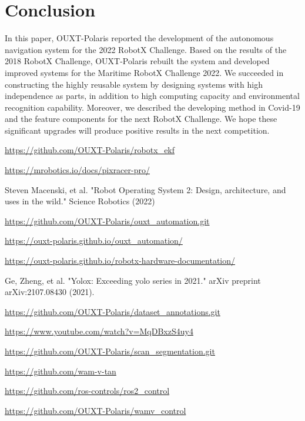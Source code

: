 \documentclass[lettersize,journal]{IEEEtran}
\begin{document}
\section{Conclusion}
In this paper, OUXT-Polaris reported the development of the autonomous navigation system for the 2022 RobotX Challenge.
Based on the results of the 2018 RobotX Challenge, OUXT-Polaris rebuilt the system and
developed improved systems for the Maritime RobotX Challenge 2022.
We succeeded in constructing the highly reusable system by designing systems with high independence as parts,
in addition to high computing capacity and environmental recognition capability.
Moreover, we described the developing method in Covid-19 and the feature components for the next RobotX Challenge.
We hope these significant upgrades will produce positive results in the next competition.

\begin{thebibliography}{1}

    \url{https://github.com/OUXT-Polaris/robotx_ekf}

    \url{https://mrobotics.io/docs/pixracer-pro/}

    Steven Macenski, et al. "Robot Operating System 2: Design, architecture, and uses in the wild." Science Robotics (2022)

    \url{https://github.com/OUXT-Polaris/ouxt_automation.git}

    \url{https://ouxt-polaris.github.io/ouxt_automation/}

    \url{https://ouxt-polaris.github.io/robotx-hardware-documentation/}

    Ge, Zheng, et al. "Yolox: Exceeding yolo series in 2021." arXiv preprint arXiv:2107.08430 (2021).

    \url{https://github.com/OUXT-Polaris/dataset_annotations.git}

    \url{https://www.youtube.com/watch?v=MqDBxzS4uy4}

    \url{https://github.com/OUXT-Polaris/scan_segmentation.git}

    \url{https://github.com/wam-v-tan}

  \url{https://github.com/ros-controls/ros2_control}

  \url{https://github.com/OUXT-Polaris/wamv_control}

\end{thebibliography}

\vfill
\end{document}

